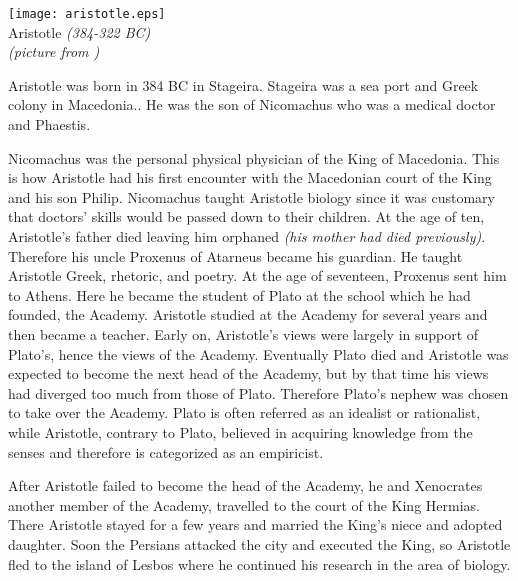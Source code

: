 \documentclass[12pt]{article}
\begin{document}

\begin{center}
\texttt{[image: aristotle.eps]}\\
\small Aristotle \textit{(384-322 BC)}\\
\textit{(picture from \cite{WA})}
\end{center}

Aristotle was born in 384 BC in Stageira.\cite{BI}  Stageira was a sea port and Greek colony in Macedonia.\cite{WA}.  He was the son of Nicomachus who was a medical doctor and Phaestis.\cite{OR}
 
Nicomachus was the personal physical physician of the King of Macedonia.  This is how Aristotle had his first encounter with the Macedonian court of the King and his son Philip.  Nicomachus taught Aristotle biology since it was customary that doctors' skills would be passed down to their children.  At the age of ten, Aristotle's father died leaving him orphaned \textit{(his mother had died previously)}.  Therefore his uncle Proxenus of Atarneus became his guardian.  He taught Aristotle Greek, rhetoric, and poetry.\cite{OR}  
At the age of seventeen, Proxenus sent him to Athens.  Here he became the student of Plato at the school which he had founded, the Academy.\cite{IEP}  Aristotle studied at the Academy for several years and then became a teacher.  Early on, Aristotle's views were largely in support of Plato's, hence the views of the Academy. Eventually Plato died and Aristotle was expected to become the next head of the Academy, but by that time his views had diverged too much from those of Plato.\cite{OR}  Therefore Plato's nephew was chosen to take over the Academy.  Plato is often referred as an idealist or rationalist, while Aristotle, contrary to Plato, believed in acquiring knowledge from the senses and therefore is categorized as an empiricist.\cite{WA}

After Aristotle failed to become the head of the Academy, he and Xenocrates another member of the Academy, travelled to the court of the King Hermias.\cite{WA}  There Aristotle stayed for a few years and married the King's niece and adopted daughter.\cite{IEP}  Soon the Persians attacked the city and executed the King, so Aristotle fled to the island of Lesbos where he continued his research in the area of biology.\cite{OR}
\end{document}
